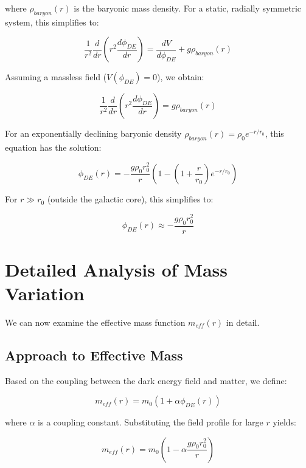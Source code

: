 \documentclass[a4paper,12pt]{article}
\begin{document}
where $\rho_{baryon}(r)$ is the baryonic mass density. For a static, radially symmetric system, this simplifies to:

\begin{equation}
	\frac{1}{r^2}\frac{d}{dr}\left(r^2\frac{d\phi_{DE}}{dr}\right) = \frac{dV}{d\phi_{DE}} + g\rho_{baryon}(r)
\end{equation}

Assuming a massless field ($V(\phi_{DE}) = 0$), we obtain:

\begin{equation}
	\frac{1}{r^2}\frac{d}{dr}\left(r^2\frac{d\phi_{DE}}{dr}\right) = g\rho_{baryon}(r)
\end{equation}

For an exponentially declining baryonic density $\rho_{baryon}(r) = \rho_0 e^{-r/r_0}$, this equation has the solution:

\begin{equation}
	\phi_{DE}(r) = -\frac{g\rho_0 r_0^2}{r}(1 - (1 + \frac{r}{r_0})e^{-r/r_0})
\end{equation}

For $r \gg r_0$ (outside the galactic core), this simplifies to:

\begin{equation}
	\phi_{DE}(r) \approx -\frac{g\rho_0 r_0^2}{r}
\end{equation}

\section{Detailed Analysis of Mass Variation}

We can now examine the effective mass function $m_{eff}(r)$ in detail.

\subsection{Approach to Effective Mass}

Based on the coupling between the dark energy field and matter, we define:

\begin{equation}
	m_{eff}(r) = m_0(1 + \alpha\phi_{DE}(r))
\end{equation}

where $\alpha$ is a coupling constant. Substituting the field profile for large $r$ yields:

\begin{equation}
	m_{eff}(r) = m_0\left(1 - \alpha\frac{g\rho_0 r_0^2}{r}\right)
\end{equation}
\end{document}
